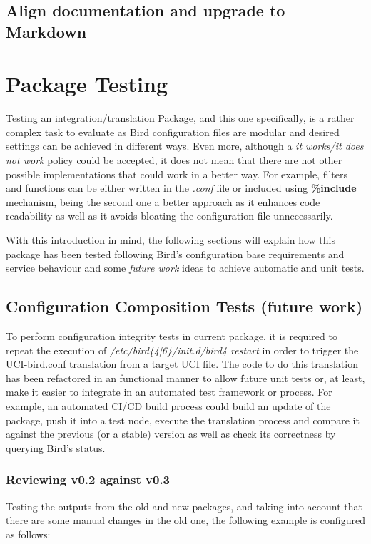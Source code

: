 \subsection{Align documentation and upgrade to Markdown}

\newpage
\section{Package Testing}
Testing an integration/translation Package, and this one specifically, is a rather complex task to evaluate as Bird configuration files are modular and desired settings can be achieved in different ways. Even more, although a \textit{it works/it does not work} policy could be accepted, it does not mean that there are not other possible implementations that could work in a better way. For example, filters and functions can be either written in the \textit{.conf} file or included using \textbf{\%include} mechanism, being the second one a better approach as it enhances code readability as well as it avoids bloating the configuration file unnecessarily.


With this introduction in mind, the following sections will explain how this package has been tested following Bird's configuration base requirements and service behaviour and some \textit{future work} ideas to achieve automatic and unit tests.

\subsection{Configuration Composition Tests (future work)}
To perform configuration integrity tests in current package, it is required to repeat the execution of \textit{/etc/bird\{4|6\}/init.d/bird4 restart} in order to trigger the UCI-bird.conf translation from a target UCI file. The code to do this translation has been refactored in an functional manner to allow future unit tests or, at least, make it easier to integrate in an automated test framework or process. For example, an automated CI/CD build process could build an update of the package, push it into a test node, execute the translation process and compare it against the previous (or a stable) version as well as check its correctness by querying Bird's status.

\subsubsection{Reviewing v0.2 against v0.3}
Testing the outputs from the old and new packages, and taking into account that there are some manual changes in the old one, the following example is configured as follows:

